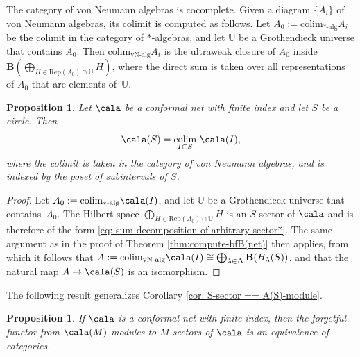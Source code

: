 \documentclass[a4paper,10pt,leqno]{amsart}
\newcommand{\IU}{\mathbb{U}}     \newcommand{\calu}{\mathcal{U}}
\newcommand{\bfB}{{\mathbf B}}   \newcommand{\sfB}{{\mathsf{B}}}
\theoremstyle{plain}
\newtheorem{proposition}[theorem]{Proposition}
\theoremstyle{definition}
\theoremstyle{remark}
\begin{document}
The category of von Neumann algebras is cocomplete.
Given a diagram $\{A_i\}$ of von Neumann algebras, its colimit is computed as follows.
Let $A_0:=\mathrm{colim}_{\text{$*$-alg}}A_i$ be the colimit in the category of $*$-algebras,
and let $\IU$ be a Grothendieck universe that contains $A_0$.
Then $\mathrm{colim}_{\text{vN-alg}}A_i$ is the ultraweak closure of $A_0$ inside $\bfB(\bigoplus_{H\in \mathrm{Rep}(A_0)\cap \IU} H)$, where
the direct sum is taken over all representations of $A_0$ that are elements of~$\IU$.

\begin{proposition}\label{prop: colim over S}
Let $\cala$ be a conformal net with finite index and let $S$ be a circle.
Then
\[
\cala(S) = \underset{I\subset S}{\mathrm{colim}}\,\,\cala(I),
\]
where the colimit is taken in the category of von Neumann algebras, and is indexed by the poset of subintervals of $S$.
\end{proposition}

\begin{proof}
Let $A_0:=\mathrm{colim}_{\text{$*$-alg}}\cala(I)$, and let $\IU$ be a Grothendieck universe that contains~$A_0$.
The Hilbert space $\bigoplus_{H\in \mathrm{Rep}(A_0)\cap \IU} H$ is an $S$-sector of $\cala$ and is therefore of the form \eqref{eq: sum decomposition of arbitrary sector*}.
The same argument as in the proof of Theorem \ref{thm:compute-bfB(net)} then applies,
from which it follows that $A:=\mathrm{colim}_{\text{vN-alg}}\cala(I)\cong \bigoplus_{\lambda\in\Delta} \bfB(H_\lambda(S))$,
and that the natural map $A\to\cala(S)$ is an isomorphism.
\end{proof}

The following result generalizes Corollary \ref{cor: S-sector == A(S)-module}.

\begin{proposition}\label{prop: M-sector == A(M)-module}
If $\cala$ is a conformal net with finite index, then
the forgetful functor from $\cala(M)$-modules to $M$-sectors of $\cala$
is an equivalence of categories.
\end{proposition}
\end{document}
